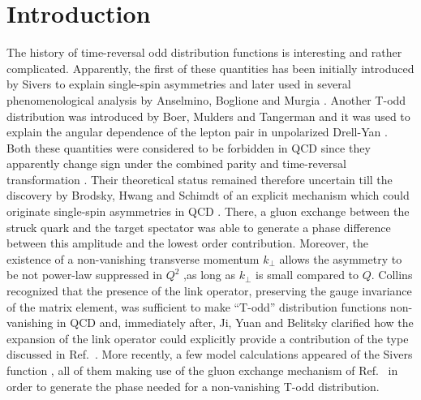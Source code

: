 \documentclass[]{revtex4}
\begin{document}
\section{Introduction}
The history of time-reversal odd distribution functions is 
interesting and rather complicated. Apparently, 
the first of these quantities
has been initially introduced by Sivers 
to explain single-spin asymmetries \cite{Sivers:1989cc,Sivers:1990fh}
and later used in several phenomenological analysis by
Anselmino, Boglione and Murgia \cite{Anselmino:1994tv,Anselmino:1998yz}.
Another T-odd distribution was introduced by Boer, Mulders and 
Tangerman and it was used to explain the angular dependence of 
the lepton pair in
unpolarized Drell-Yan \cite{Mulders:1995dh,Boer:1997nt,Boer:1999mm}.
Both these quantities were considered to be forbidden in QCD since they
apparently change sign under the combined parity and time-reversal
transformation \cite{Collins:1992kk}. Their theoretical status
remained therefore uncertain till the discovery by
Brodsky, Hwang and Schimdt of an explicit mechanism which
could originate single-spin asymmetries in QCD \cite{Brodsky:2002cx}.
There, a gluon exchange between the struck quark and the
target spectator was able to generate a phase difference
between this amplitude and the
lowest order contribution. Moreover, the existence of a 
non-vanishing transverse momentum $k_\perp$ allows the asymmetry to be
not power-law suppressed in $Q^2$ ,as long as $k_\perp$ is small
compared to $Q$.  
Collins recognized that the presence of the link operator,
preserving the gauge invariance of the matrix element, was 
sufficient to make ``T-odd'' distribution functions non-vanishing in
QCD \cite{Collins:2002kn}
and, immediately after, Ji, Yuan and Belitsky 
\cite{Ji:2002aa,Belitsky:2002sm}
clarified how the
expansion of the link operator could explicitly provide a contribution
of the type discussed in Ref.~\cite{Brodsky:2002cx}.
More recently, a few model calculations appeared of the 
Sivers function \cite{Yuan:2003wk,Bacchetta:2003rz,Lu:2004au},
all of them making use of the gluon exchange
mechanism of Ref.~\cite{Brodsky:2002cx} in order to generate the 
phase needed for a non-vanishing T-odd distribution.
\end{document}

